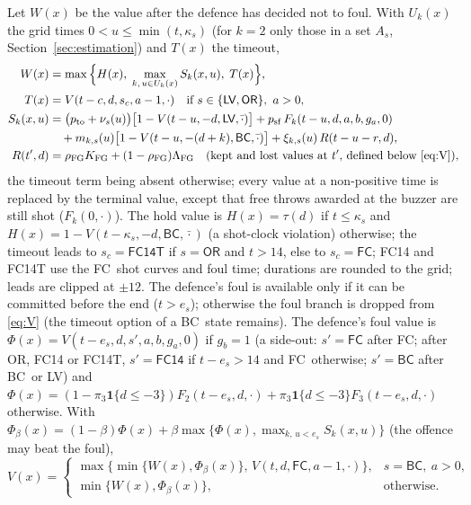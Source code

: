 \documentclass[article]{jdssv}
\newcommand{\BC}{\textsf{BC}}
\newcommand{\FC}{\textsf{FC}}
\newcommand{\LV}{\textsf{LV}}
\newcommand{\OR}{\textsf{OR}}
\begin{document}
Let $W(x)$ be the value after the defence has decided not to foul. With $U_k(x)$ the grid times
$0<u\le\min(t,\kappa_s)$ (for $k=2$ only those in a set $A_s$, Section~\ref{sec:estimation}) and $T(x)$ the timeout,
\begin{align}
W(x) &= \max\Big\{H(x),\; \max_{k,\,u\in U_k(x)} S_k(x,u),\; T(x)\Big\},\label{eq:W}\\
T(x) &= V(t-c,d,s_c,a-1,\cdot)\quad\text{if } s\in\{\LV,\OR\},\ a>0,\nonumber\\
S_k(x,u) &= \big(p_{\mathrm{to}}+\nu_s(u)\big)\big[1-V(t-u,-d,\LV,\bar\cdot)\big] + p_{\mathrm{sf}}\,F_k(t-u,d,a,b,g_a,0)\nonumber\\
 &\quad + m_{k,s}(u)\big[1-V(t-u,-(d+k),\BC,\bar\cdot)\big] + \xi_{k,s}(u)\,R(t-u-r,d),\nonumber\\
R(t',d) &= \rho_{\mathrm{FG}}K_{\mathrm{FG}}+(1-\rho_{\mathrm{FG}})\Lambda_{\mathrm{FG}}\quad\text{(kept and lost values at $t'$, defined below \eqref{eq:V})},\nonumber
\end{align}
the timeout term being absent otherwise; every value at a non-positive time is replaced by the terminal value, except that free throws awarded
at the buzzer are still shot ($F_k(0,\cdot)$). The hold value is $H(x)=\tau(d)$ if $t\le\kappa_s$ and
$H(x)=1-V(t-\kappa_s,-d,\BC,\bar\cdot)$ (a shot-clock violation) otherwise; the timeout leads to $s_c=\textsf{FC14T}$ if $s=\OR$
and $t>14$, else to $s_c=\FC$; \textsf{FC14} and \textsf{FC14T} use the \FC\ shot curves and foul time; durations are rounded to the grid; leads are clipped at $\pm12$. The defence's
foul is available only if it can be committed before the end ($t>e_s$); otherwise the foul branch is dropped
from \eqref{eq:V} (the timeout option of a \BC\ state remains). The defence's foul value is
$\Phi(x)=V(t-e_s,d,s',a,b,g_a,0)$ if $g_b=1$ (a side-out: $s'=\FC$ after \FC; after \OR, \textsf{FC14} or
\textsf{FC14T}, $s'=\textsf{FC14}$ if $t-e_s>14$ and \FC\ otherwise; $s'=\BC$ after \BC\ or \LV) and
$\Phi(x)=(1-\pi_3\mathbf{1}\{d\le-3\})F_2(t-e_s,d,\cdot)+\pi_3\mathbf{1}\{d\le-3\}F_3(t-e_s,d,\cdot)$ otherwise. With
$\Phi_\beta(x)=(1-\beta)\Phi(x)+\beta\max\{\Phi(x),\max_{k,\,u<e_s}S_k(x,u)\}$ (the offence may beat the foul),
\begin{equation}
V(x)=\begin{cases}\max\big\{\min\{W(x),\Phi_\beta(x)\},\,V(t,d,\FC,a-1,\cdot)\big\}, & s=\BC,\ a>0,\\
\min\{W(x),\Phi_\beta(x)\}, & \text{otherwise.}\end{cases} \label{eq:V}
\end{equation}
\end{document}
